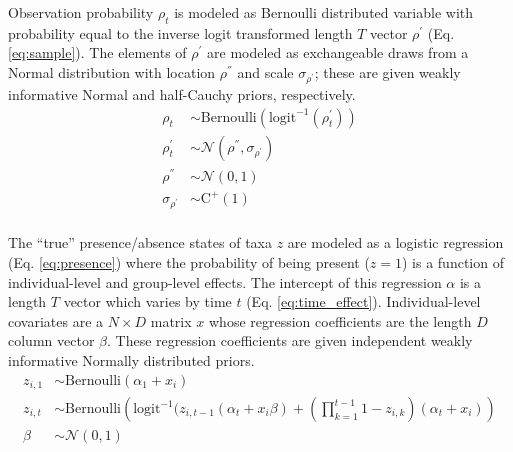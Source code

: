 \documentclass[12pt,letterpaper]{article}
\begin{document}
Observation probability \(\rho_{t}\) is modeled as Bernoulli distributed variable with probability equal to the inverse logit transformed length \(T\) vector \(\rho^{\prime}\) (Eq. \ref{eq:sample}). The elements of \(\rho^{\prime}\) are modeled as exchangeable draws from a Normal distribution with location \(\rho^{''}\) and scale \(\sigma_{\rho^{\prime}}\); these are given weakly informative Normal and half-Cauchy priors, respectively. %
\begin{equation}
  \begin{aligned}
    \rho_{t} &\sim \text{Bernoulli}\left(\text{logit}^{-1}(\rho^{\prime}_{t})\right) \\
    \rho^{\prime}_{t} &\sim \mathcal{N}(\rho^{''}, \sigma_{\rho^{\prime}}) \\
    \rho^{''} &\sim \mathcal{N}(0, 1) \\
    \sigma_{\rho^{\prime}} &\sim \text{C}^{+}(1) \\
  \end{aligned}
  \label{eq:sample}
\end{equation}


The ``true'' presence/absence states of taxa \(z\) are modeled as a logistic regression (Eq. \ref{eq:presence}) where the probability of being present (\(z = 1\)) is a function of individual-level and group-level effects. The intercept of this regression \(\alpha\) is a length \(T\) vector which varies by time \(t\) (Eq. \ref{eq:time_effect}). Individual-level covariates are a \(N \times D\) matrix \(x\) whose regression coefficients are the length \(D\) column vector \(\beta\). These regression coefficients are given independent weakly informative Normally distributed priors.
\begin{equation}
  \begin{aligned}
    z_{i,1} &\sim \text{Bernoulli}(\alpha_{1} + x_{i}) \\
    z_{i,t} &\sim \text{Bernoulli}\left(\text{logit}^{-1}(z_{i,t-1} (\alpha_{t} + x_{i} \beta) + \left(\prod_{k = 1}^{t-1} 1 - z_{i,k}\right) (\alpha_{t} + x_{i})\right) \\
    \beta &\sim \mathcal{N}(0, 1) \\
  \end{aligned}
  \label{eq:presence}
\end{equation}
\end{document}
